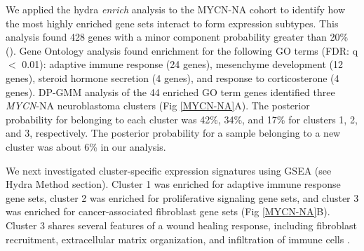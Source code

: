 \documentclass[10pt,letterpaper]{article}
\begin{document}
We applied the hydra \textit{enrich} analysis to the MYCN-NA cohort to identify how the most highly enriched gene sets interact to form expression subtypes. This analysis found 428 genes with a minor component probability greater than 20\% (). Gene Ontology analysis found enrichment for the following GO terms (FDR: q $<$ 0.01): adaptive immune response (24 genes), mesenchyme development (12 genes), steroid hormone secretion (4 genes), and response to corticosterone (4 genes). DP-GMM analysis of the 44 enriched GO term genes identified three \textit{MYCN}-NA neuroblastoma clusters (Fig \ref{MYCN-NA}A). The posterior probability for belonging to each cluster was 42\%, 34\%, and 17\% for clusters 1, 2, and 3, respectively. The posterior probability for a sample belonging to a new cluster was about 6\% in our analysis.

We next investigated cluster-specific expression signatures using GSEA (see Hydra Method section). Cluster 1 was enriched for adaptive immune response gene sets, cluster 2 was enriched for proliferative signaling gene sets, and cluster 3 was enriched for cancer-associated fibroblast gene sets (Fig \ref{MYCN-NA}B). Cluster 3 shares several features of a wound healing response, including fibroblast recruitment, extracellular matrix organization, and infiltration of immune cells \cite{fosterEvolvingRelationshipWound}.
\end{document}
